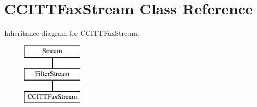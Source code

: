 \hypertarget{class_c_c_i_t_t_fax_stream}{}\section{C\+C\+I\+T\+T\+Fax\+Stream Class Reference}
\label{class_c_c_i_t_t_fax_stream}
Inheritance diagram for C\+C\+I\+T\+T\+Fax\+Stream\+:\begin{figure}[H]
\begin{center}
\leavevmode
\includegraphics[height=3.000000cm]{class_c_c_i_t_t_fax_stream}
\end{center}
\end{figure}
